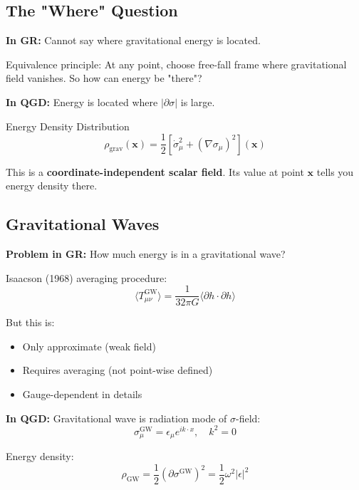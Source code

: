 \documentclass[11pt,a4paper]{article}
\theoremstyle{definition}
\theoremstyle{remark}
\begin{document}
	\subsection{The "Where" Question}
	
	\textbf{In GR:} Cannot say where gravitational energy is located.
	
	Equivalence principle: At any point, choose free-fall frame where gravitational field vanishes. So how can energy be "there"?
	
	\textbf{In QGD:} Energy is located where $|\partial\sigma|$ is large.
	
	Energy Density Distribution
		\begin{equation}
			\rho_{\text{grav}}(\mathbf{x}) = \frac{1}{2}\left[\dot{\sigma}_\mu^2 + (\nabla\sigma_\mu)^2\right](\mathbf{x})
		\end{equation}
	
	This is a \textbf{coordinate-independent scalar field}. Its value at point $\mathbf{x}$ tells you energy density there.
	
	\subsection{Gravitational Waves}
	
	\textbf{Problem in GR:} How much energy is in a gravitational wave?
	
	Isaacson (1968) averaging procedure:
	\begin{equation}
		\langle T_{\mu\nu}^{\text{GW}}\rangle = \frac{1}{32\pi G}\langle\partial h \cdot \partial h\rangle
	\end{equation}
	
	But this is:
	\begin{itemize}
		\item Only approximate (weak field)
		\item Requires averaging (not point-wise defined)
		\item Gauge-dependent in details
	\end{itemize}
	
	\textbf{In QGD:} Gravitational wave is radiation mode of $\sigma$-field:
	\begin{equation}
		\sigma_{\mu}^{\text{GW}} = \epsilon_\mu e^{ik \cdot x}, \quad k^2 = 0
	\end{equation}
	
	Energy density:
	\begin{equation}
		\boxed{\rho_{\text{GW}} = \frac{1}{2}(\partial\sigma^{\text{GW}})^2 = \frac{1}{2}\omega^2|\epsilon|^2}
	\end{equation}
	
\end{document}
